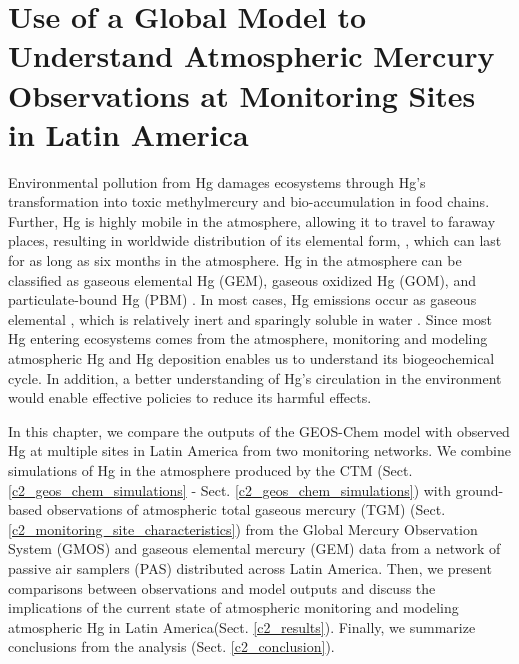 \chapter{Use of a Global Model to Understand Atmospheric Mercury Observations at Monitoring Sites in Latin America }\label{chapter2}
\begin{flushleft}
Environmental pollution from Hg damages ecosystems through Hg's transformation into toxic methylmercury and bio-accumulation in food chains. Further, Hg is highly mobile in the atmosphere, allowing it to travel to faraway places, resulting in worldwide distribution of its elemental form, \hg, which can last for as long as six months in the atmosphere\cite{horowitz_new_2017,shah_improved_2021}. Hg in the atmosphere can be classified as gaseous elemental Hg (GEM), gaseous oxidized Hg (GOM), and particulate-bound Hg (PBM)  \cite{lindberg_synthesis_2007,schroeder_atmospheric_1998,landis_development_2002}. In most cases, Hg emissions occur as gaseous elemental \hg, which is relatively inert and sparingly soluble in water \cite{horowitz_new_2017}. Since most Hg entering ecosystems comes from the atmosphere, monitoring and modeling atmospheric Hg and Hg deposition enables us to understand its biogeochemical cycle. In addition, a better understanding of Hg's circulation in the environment would enable effective policies to reduce its harmful effects.
\end{flushleft}
\begin{flushleft}
 In this chapter, we compare the outputs of the GEOS-Chem model with observed Hg at multiple sites in Latin America from two monitoring networks. We combine simulations of Hg in the atmosphere produced by the \gc CTM (Sect. \ref{c2_geos_chem_simulations} - Sect. \ref{c2_geos_chem_simulations}) with ground-based observations of atmospheric total gaseous mercury (TGM) (Sect. \ref{c2_monitoring_site_characteristics}) from the Global Mercury Observation System (GMOS)\cite{sprovieri_atmospheric_2016} and gaseous elemental mercury (GEM) data from a network of passive air samplers (PAS)\cite{quant_measuring_2021} distributed across Latin America. Then, we present comparisons between observations and model outputs and discuss the implications of the current state of atmospheric monitoring and modeling atmospheric Hg in Latin America(Sect. \ref{c2_results}). Finally, we summarize conclusions from the analysis (Sect. \ref{c2_conclusion}).
\end{flushleft}
